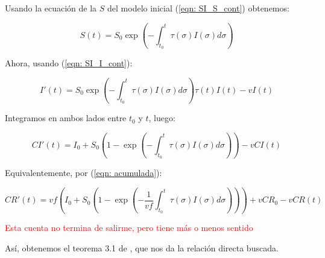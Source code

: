 Usando la ecuación de la $S$ del modelo inicial (\ref{eqn: SI_S_cont}) obtenemos:

$$S(t) = S_0 \exp{\left( - \int_{t_0}^t \tau(\sigma ) I(\sigma ) d\sigma \right) } $$ 

Ahora, usando (\ref{eqn: SI_I_cont}):

$$I'(t) = S_0 \exp{\left( - \int_{t_0}^t \tau(\sigma ) I(\sigma ) d\sigma \right) } \tau (t) I(t) -vI(t) $$

Integramos en ambos lados entre $t_0$ y $t$, luego:

$$ CI'(t) = I_0 + S_0 \left( 1-\exp{\left(- \int_{t_0}^t \tau (\sigma ) I(\sigma )d\sigma \right)}\right) -vCI(t)$$

Equivalentemente, por (\ref{eqn: acumulada}):

$$CR'(t) = vf\left( I_0 + S_0 \left( 1-\exp{\left(- \frac{1}{vf}\int_{t_0}^t \tau (\sigma ) I(\sigma )d\sigma \right)}\right)\right) +vCR_0 -vCR(t)$$

\textcolor{red}{Esta cuenta no termina de salirme, pero tiene más o menos sentido}

Así, obtenemos el teorema 3.1 de \cite{demongeotSIEpidemicModel}, que nos da la relación directa buscada.







